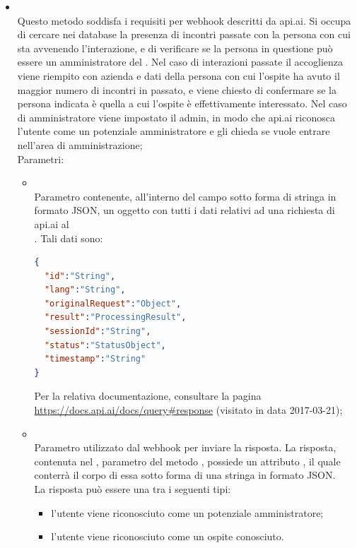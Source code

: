 \begin{itemize}
\begin{itemize}
		\item[]  \\		Questo metodo soddisfa i requisiti per webhook descritti da api.ai. Si occupa di cercare nei database la presenza di incontri passate con la persona con cui sta avvenendo l'interazione, e di verificare se la persona in questione può essere un amministratore del . Nel caso di interazioni passate il  accoglienza viene riempito con azienda e dati della persona con cui l'ospite ha avuto il maggior numero di incontri in passato, e viene chiesto di confermare se la persona indicata è quella a cui l'ospite è effettivamente interessato. Nel caso di amministratore viene impostato il  admin, in modo che api.ai riconosca l'utente come un potenziale amministratore e gli chieda se vuole entrare nell'area di amministrazione;\\
		Parametri:
		\begin{itemize}
			\item {} \\
			Parametro contenente, all'interno del campo  sotto forma di stringa in formato JSON, un oggetto con tutti i dati relativi ad una richiesta di api.ai al \\ . Tali dati sono:
\begin{lstlisting}[language=json,firstnumber=1]
{
  "id":"String",
  "lang":"String",
  "originalRequest":"Object",
  "result":"ProcessingResult",
  "sessionId":"String",
  "status":"StatusObject",
  "timestamp":"String"
}
			\end{lstlisting}
			Per la relativa documentazione, consultare la pagina \url{https://docs.api.ai/docs/query#response} (visitato in data 2017-03-21);
			\item {} \\
			Parametro utilizzato dal webhook per inviare la risposta. La risposta, contenuta nel , parametro del metodo , possiede un attributo , il quale conterrà il corpo di essa sotto forma di una stringa in formato JSON. \\
			La risposta può essere una tra i seguenti tipi:
			\begin{itemize}
				\item l'utente viene riconosciuto come un potenziale amministratore;
				\item l'utente viene riconosciuto come un ospite conosciuto.

\end{itemize}
\end{itemize}
\end{itemize}
\end{itemize}
